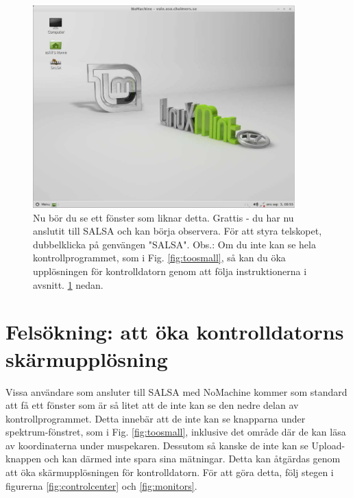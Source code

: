 \begin{figure}[H]
    \centering
	\includegraphics[width=0.9\textwidth]{../figures/nomachinefigs/fig9-connected.pdf}
    \caption{Nu bör du se ett fönster som liknar detta. Grattis - du har nu anslutit till SALSA och kan
		börja observera. För att styra telskopet, dubbelklicka på genvängen "SALSA". Obs.: Om du inte
		kan se hela kontrollprogrammet, som i Fig. \ref{fig:toosmall}, så kan du öka upplösningen för
		kontrolldatorn genom att följa instruktionerna i avsnitt. \ref{sect:screenres} nedan.} 
\label{fig:connected} 
\end{figure}

\section{Felsökning: att öka kontrolldatorns skärmupplösning}
\label{sect:screenres}
Vissa användare som ansluter till SALSA med NoMachine kommer som standard
att få ett fönster som är så litet att de inte kan se den nedre delan av kontrollprogrammet.
Detta innebär att de inte kan se knapparna under spektrum-fönstret, som i Fig. \ref{fig:toosmall}, 
inklusive det område där de kan läsa av koordinaterna under muspekaren. 
Dessutom så kanske de inte kan se Upload-knappen och kan därmed inte spara sina mätningar. 
Detta kan åtgärdas genom att öka skärmupplösningen för kontrolldatorn. För att göra detta,
följ stegen i figurerna \ref{fig:controlcenter} och \ref{fig:monitors}.

